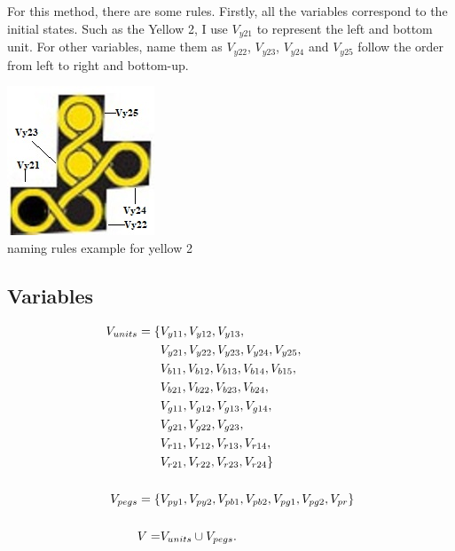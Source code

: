 For this method, there are some rules. Firstly, all the variables correspond to the initial states. Such as the Yellow 2, I use $V_{y21}$ to represent the left and bottom unit. For other variables, name them as $V_{y22}$, $V_{y23}$, $V_{y24}$ and $V_{y25}$ follow the order from left to right and bottom-up.
\begin{center}
\includegraphics{example.jpg}
\\naming rules example for yellow 2
\end{center}
\subsection{Variables}
\begin{align*}
V_{units}=\{&V_{y11},V_{y12},V_{y13},\\&V_{y21},V_{y22},V_{y23},V_{y24},V_{y25},\\&V_{b11},V_{b12},V_{b13},V_{b14},
V_{b15},\\&V_{b21},V_{b22},V_{b23},V_{b24},\\&V_{g11},V_{g12},V_{g13},V_{g14},\\&V_{g21},V_{g22},V_{g23},\\&V_{r11},
V_{r12},V_{r13},V_{r14},\\&V_{r21},V_{r22},V_{r23},V_{r24}\}\\
\\V_{pegs} = \{&V_{py1}, V_{py2}, V_{pb1}, V_{pb2}, V_{pg1}, V_{pg2}, V_{pr}\}\\
\\V = &V_{units} \cup V_{pegs}.
\end{align*}

